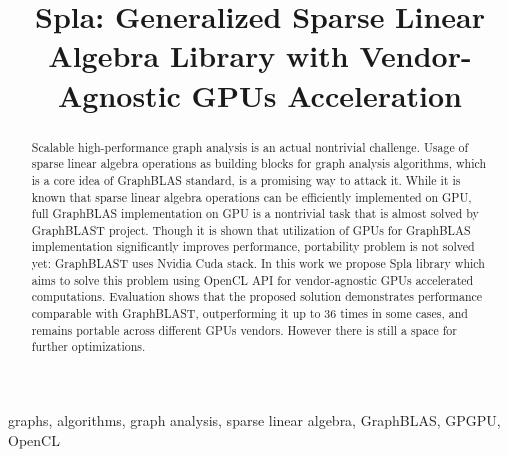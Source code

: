 \documentclass[conference]{IEEEtran}
\begin{document}
\title{Spla: Generalized Sparse Linear Algebra Library with Vendor-Agnostic GPUs Acceleration}

\author{
\and
{}
}

\maketitle

\begin{abstract}
    Scalable high-performance graph analysis is an actual nontrivial challenge. 
    Usage of sparse linear algebra operations as building blocks for graph analysis algorithms, which is a core idea of GraphBLAS standard, is a promising way to attack it.
    While it is known that sparse linear algebra operations can be efficiently implemented on GPU, full GraphBLAS implementation on GPU is a nontrivial task that is almost solved by GraphBLAST project. 
    Though it is shown that utilization of GPUs for GraphBLAS implementation significantly improves performance, portability problem is not solved yet: GraphBLAST uses Nvidia Cuda stack.
    In this work we propose Spla library which aims to solve this problem using OpenCL API for vendor-agnostic GPUs accelerated computations.
    Evaluation shows that the proposed solution demonstrates performance comparable with GraphBLAST, outperforming it up to 36 times in some cases, and remains portable across different GPUs vendors. 
    However there is still a space for further optimizations.
\end{abstract}

\begin{IEEEkeywords}
graphs, algorithms, graph analysis, sparse linear algebra, GraphBLAS, GPGPU, OpenCL
\end{IEEEkeywords}








\end{document}
